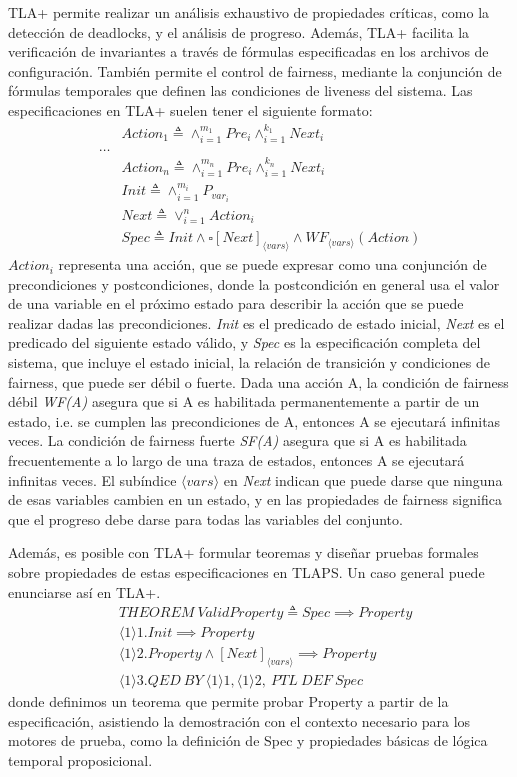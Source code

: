 \documentclass[runningheads]{llncs}
\begin{document}
TLA+ permite realizar un análisis exhaustivo de propiedades críticas, como la detección de deadlocks, y el análisis de progreso. Además, TLA+ facilita la verificación de invariantes a través de fórmulas especificadas en los archivos de configuración. También permite el control de fairness, mediante la conjunción de fórmulas temporales que definen las condiciones de liveness del sistema. Las especificaciones en TLA+ suelen tener el siguiente formato:
%
\[
\begin{aligned}
    & Action_1 \triangleq \land_{i=1}^{m_1} Pre_i \land_{i=1}^{k_1} Next_i \\
    \dots \\
    & Action_n \triangleq \land_{i=1}^{m_n} Pre_i \land_{i=1}^{k_n} Next_i \\
    & Init \triangleq \land_{i=1}^{m_i} P_{var_i} \\
    & Next \triangleq \lor_{i=1}^{n} Action_i \\
    & Spec \triangleq Init \land \square [Next]_{\langle vars \rangle} \land WF_{\langle vars \rangle}(Action)
\end{aligned}
\]
%
$Action_{i}$ representa una acción, que se puede expresar como una conjunción de precondiciones y postcondiciones, donde la postcondición en general usa el valor de una variable en el próximo estado para describir la acción que se puede realizar dadas las precondiciones. \textit{Init} es el predicado de estado inicial, \textit{Next} es el predicado del siguiente estado válido, y \textit{Spec} es la especificación completa del sistema, que incluye el estado inicial, la relación de transición y condiciones de fairness, que puede ser débil o fuerte. Dada una acción A, la condición de fairness débil \textit{WF(A)} asegura que si A es habilitada permanentemente a partir de un estado, i.e. se cumplen las precondiciones de A, entonces A se ejecutará infinitas veces. La condición de fairness fuerte \textit{SF(A)} asegura que si A es habilitada frecuentemente a lo largo de una traza de estados, entonces A se ejecutará infinitas veces. El subíndice $\langle vars \rangle$ en \textit{Next} indican que puede darse que ninguna de esas variables cambien en un estado, y en las propiedades de fairness significa que el progreso debe darse para todas las variables del conjunto. 

Además, es posible con TLA+ formular teoremas y diseñar pruebas formales sobre propiedades de estas especificaciones en TLAPS. Un caso general puede enunciarse así en TLA+.
%
\[
\begin{aligned}
    & THEOREM\ ValidProperty \triangleq Spec \implies Property \\
    & \langle 1 \rangle1. Init \implies Property \\
    & \langle 1 \rangle2. Property \land [Next]_{\langle vars \rangle} \implies Property \\
    & \langle 1 \rangle3. QED\ BY\ \langle 1 \rangle1, \langle 1 \rangle2,\ PTL\ DEF\ Spec
\end{aligned}
\]
%
donde definimos un teorema que permite probar Property a partir de la especificación, asistiendo la demostración con el contexto necesario para los motores de prueba, como la definición de Spec y propiedades básicas de lógica temporal proposicional.
\end{document}
